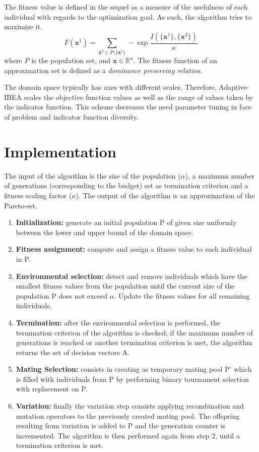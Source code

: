\documentclass{sig-alternate}
\begin{document}
The fitness value is defined in the sequel as a measure of the usefulness of each individual with regards to the optimization goal. As such, the algorithm tries to maximize it.
$$ F(\bm{x}^1) = \sum_{\bm{x}^2 \in P \setminus \{\bm{x}^1\}} - \exp{\frac{I(\{\bm{x}^1\}, \{\bm{x}^2\})}{\kappa}}$$ where $P$ is the population set, and $\bm{x} \in \mathbb{R}^n$. The fitness function of an approximation set is defined as a \emph{dominance preserving relation}.

The domain space typically has axes with different scales. Therefore, Adaptive-IBEA scales the objective function values as well as the range of values taken by the indicator function. This scheme decreases the need parameter tuning in face of problem and indicator function diversity.

\section{Implementation}
The input of the algorithm is the size of the population ($\alpha$), a maximum number of generations (corresponding to the budget) set as termination criterion and a fitness scaling factor ($\kappa$). The output of the algorithm is an approximation of the Pareto-set.
\begin{enumerate}
\item \textbf{Initialization:} generate an initial population P of given size uniformly between the lower and upper bound of the domain space.

\item \textbf{Fitness assignment:} compute and assign a fitness value to each individual in P.

\item \textbf{Environmental selection:} detect and remove individuals which have the smallest fitness values from the population until the current size of the population P does not exceed $\alpha$. Update the fitness values for all remaining individuals.

\item \textbf{Termination:} after the environmental selection is performed, the termination criterion of the algorithm is checked; if the maximum number of generations is reached or another termination criterion is met, the algorithm returns the set of decision vectors A.

\item \textbf{Mating Selection:} consists in creating as temporary mating pool P' which is filled with individuals from P by performing binary tournament selection with replacement on P.

\item \textbf{Variation:} finally the variation step consists applying recombination and mutation operators to the previously created mating pool.  
The offspring resulting from variation is added to P and the generation counter is incremented. The algorithm is then performed again from step 2, until a termination criterion is met.

\end{enumerate}
\end{document}
